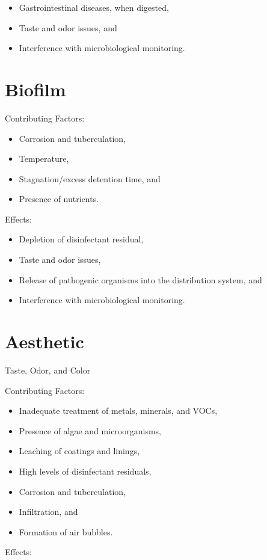 \documentclass[10pt]{article}
\begin{document}
\begin{itemize}
  \item Gastrointestinal diseases, when digested,

  \item Taste and odor issues, and

  \item Interference with microbiological monitoring.

\end{itemize}
\section{Biofilm}
Contributing Factors:

\begin{itemize}
  \item Corrosion and tuberculation,

  \item Temperature,

  \item Stagnation/excess detention time, and

  \item Presence of nutrients.

\end{itemize}
Effects:

\begin{itemize}
  \item Depletion of disinfectant residual,

  \item Taste and odor issues,

  \item Release of pathogenic organisms into the distribution system, and

  \item Interference with microbiological monitoring.

\end{itemize}
\section{Aesthetic}
Taste, Odor, and Color

Contributing Factors:

\begin{itemize}
  \item Inadequate treatment of metals, minerals, and VOCs,

  \item Presence of algae and microorganisms,

  \item Leaching of coatings and linings,

  \item High levels of disinfectant residuals,

  \item Corrosion and tuberculation,

  \item Infiltration, and

  \item Formation of air bubbles.

\end{itemize}
Effects:
\end{document}
